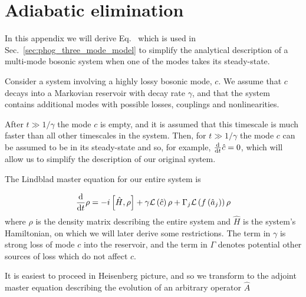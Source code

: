 %
%
%


\chapter{Adiabatic elimination}\label{sec:adiabatic_elimination}

In this appendix we will derive Eq.~ which is used in Sec.~\ref{sec:phog_three_mode_model} to simplify the analytical description of a multi-mode bosonic system when one of the modes takes its steady-state. 

Consider a system involving a highly lossy bosonic mode, $c$. We assume that $c$ decays into a Markovian reservoir with decay rate $\gamma$, and that the system contains additional modes with possible losses, couplings and nonlinearities. 

After $t \gg 1/\gamma$ the mode $c$ is empty, and it is assumed that this timescale is much faster than all other timescales in the system. Then, for $t \gg 1/\gamma$ the mode $c$ can be assumed to be in its steady-state and so, for example, $\frac{\mathrm{d}}{\mathrm{d}t} \hat{c} = 0$, which will allow us to simplify the description of our original system.

The Lindblad master equation for our entire system is

\begin{equation}
\frac{\mathrm{d}}{\mathrm{d}t} \rho = - i \left[ \hat{H}, \rho \right] + \gamma \mathcal{L}\left(\hat{c}\right) \rho + \Gamma_j\mathcal{L}\left(f\left(\hat{a}_j\right)\right) \rho
\end{equation}
where $\rho$ is the density matrix describing the entire system and $\hat{H}$ is the system's Hamiltonian, on which we will later derive some restrictions. The term in $\gamma$ is strong loss of mode $c$ into the reservoir, and the term in $\Gamma$ denotes potential other sources of loss which do not affect $c$.

It is easiest to proceed in Heisenberg picture, and so we transform to the adjoint master equation \cite{Breuer2002} describing the evolution of an arbitrary operator $\hat{A}$

